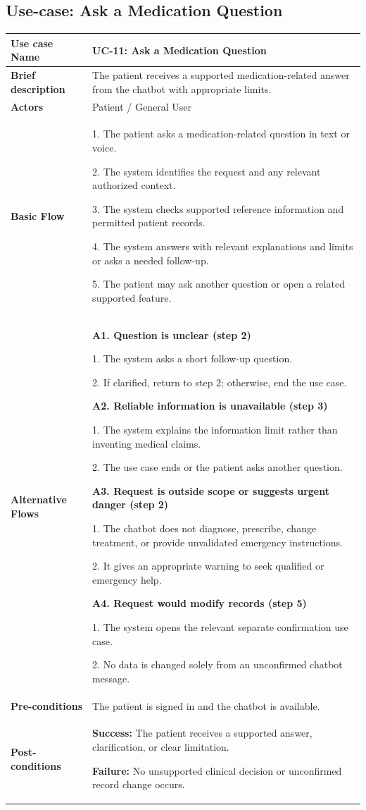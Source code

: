 \subsection{Use-case: Ask a Medication Question}
\label{uc:uc-11}
\begin{longtable}{|p{}|p{}|}
\hline
\textbf{Use case Name} & UC-11: Ask a Medication Question \\ \hline
\textbf{Brief description} & The patient receives a supported medication-related answer from the chatbot with appropriate limits. \\ \hline
\textbf{Actors} & Patient / General User \\ \hline
\textbf{Basic Flow} &
1. The patient asks a medication-related question in text or voice.\par
2. The system identifies the request and any relevant authorized context.\par
3. The system checks supported reference information and permitted patient records.\par
4. The system answers with relevant explanations and limits or asks a needed follow-up.\par
5. The patient may ask another question or open a related supported feature.
\\ \hline
\textbf{Alternative Flows} &
\textbf{A1. Question is unclear (step 2)}\par
1. The system asks a short follow-up question.\par
2. If clarified, return to step 2; otherwise, end the use case.
\par\smallskip
\textbf{A2. Reliable information is unavailable (step 3)}\par
1. The system explains the information limit rather than inventing medical claims.\par
2. The use case ends or the patient asks another question.
\par\smallskip
\textbf{A3. Request is outside scope or suggests urgent danger (step 2)}\par
1. The chatbot does not diagnose, prescribe, change treatment, or provide unvalidated emergency instructions.\par
2. It gives an appropriate warning to seek qualified or emergency help.
\par\smallskip
\textbf{A4. Request would modify records (step 5)}\par
1. The system opens the relevant separate confirmation use case.\par
2. No data is changed solely from an unconfirmed chatbot message.
\\ \hline
\textbf{Pre-conditions} & The patient is signed in and the chatbot is available. \\ \hline
\textbf{Post-conditions} & \textbf{Success:} The patient receives a supported answer, clarification, or clear limitation.\par
\textbf{Failure:} No unsupported clinical decision or unconfirmed record change occurs. \\ \hline
\end{longtable}


